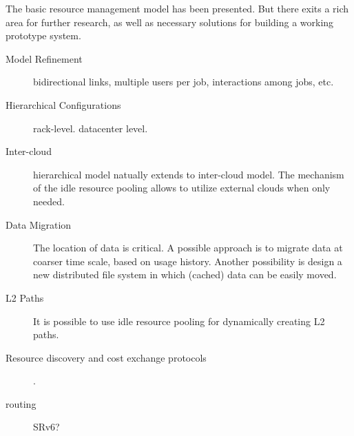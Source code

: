 
The basic resource management model has been presented.
But there exits a rich area for further research, as well as 
necessary solutions for building a working prototype system.

\begin{description}

\item[Model Refinement]  bidirectional links, multiple users per job,
  interactions among jobs, etc.
  
\item[Hierarchical Configurations]
  rack-level.  datacenter level.
  
\item[Inter-cloud]
  hierarchical model natually extends to inter-cloud model.
  The mechanism of the idle resource pooling allows to utilize external
  clouds when only needed.
  
\item[Data Migration]
  The location of data is critical.
  A possible approach is to migrate data at coarser time scale, based
  on usage history.
  Another possibility is design a new distributed file system in which
  (cached) data can be easily moved.
  
\item[L2 Paths] It is possible to use idle resource pooling for dynamically
  creating L2 paths.

\item[Resource discovery and cost exchange protocols]
\cite{Albrecht2008}.
  
\item[routing] SRv6?
  
\end{description}
